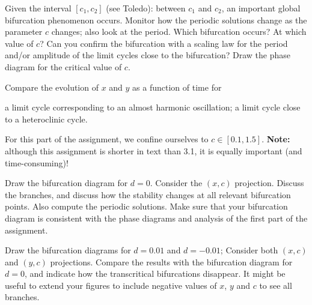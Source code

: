 \begin{Exercise}[name={A qualitative study without external influence}]
\Question Given the interval $[c_1, c_2]$ (see Toledo): between $c_1$ and $c_2$, an important global bifurcation
phenomenon occurs.  Monitor how the periodic solutions change as
the parameter $c$ changes; also look at the period.  Which
bifurcation occurs? At which value of $c$? Can you confirm the bifurcation with a scaling law for the period and/or amplitude of the limit cycles close to the bifurcation?  Draw the phase diagram
for the critical value of $c$.

\Question Compare the evolution of $x$ and $y$ as a function of time
for
\begin{tasks}
\task a limit cycle corresponding to an almost harmonic
oscillation;
\task a limit cycle close to a heteroclinic\footnotemark{} cycle.
\end{tasks}

\end{Exercise}

\begin{Exercise}[name=Bifurcation analysis]

For this part of the assignment, we confine ourselves to $c \in
[0.1, 1.5]$. \textbf{Note:} although this assignment is shorter in text than 3.1, it is equally important (and time-consuming)!

\Question Draw the bifurcation diagram for $d=0$. 
Consider the $(x,c)$ projection.
Discuss the branches, and discuss how the stability changes at all
relevant bifurcation points.  Also compute the periodic solutions.
Make sure that your bifurcation diagram is consistent with the
phase diagrams and analysis of the first part of the assignment.

\Question Draw the bifurcation diagrams for $d=0.01$ and $d=-0.01$; 
Consider both $(x,c)$ and $(y,c)$ projections. 
Compare the results with the bifurcation diagram for $d=0$, and indicate how the transcritical bifurcations disappear. It might be useful to extend your figures to include 
negative values of $x$, $y$ and $c$ to see all branches.

\end{Exercise}
